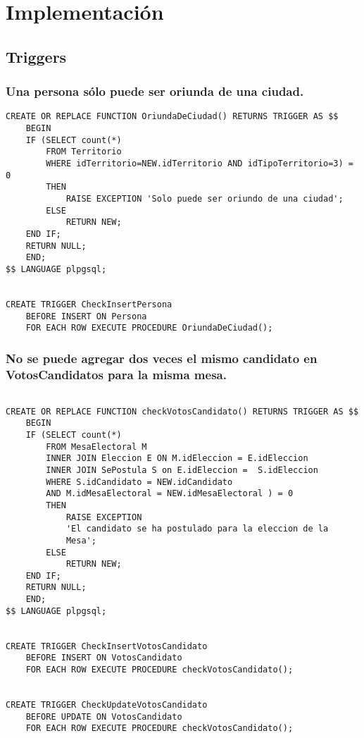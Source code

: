\section{Implementación}


\subsection{Triggers}

\subsubsection{Una persona sólo puede ser oriunda de una ciudad.}

\begin{verbatim}
CREATE OR REPLACE FUNCTION OriundaDeCiudad() RETURNS TRIGGER AS $$
    BEGIN
    IF (SELECT count(*) 
        FROM Territorio 
        WHERE idTerritorio=NEW.idTerritorio AND idTipoTerritorio=3) = 0 
        THEN
            RAISE EXCEPTION 'Solo puede ser oriundo de una ciudad';              
        ELSE
            RETURN NEW;
    END IF;
    RETURN NULL;
    END;
$$ LANGUAGE plpgsql;


CREATE TRIGGER CheckInsertPersona
    BEFORE INSERT ON Persona
    FOR EACH ROW EXECUTE PROCEDURE OriundaDeCiudad();

\end{verbatim}

\subsubsection{No se puede agregar dos veces el mismo candidato en VotosCandidatos para la misma mesa.}
\begin{verbatim}

CREATE OR REPLACE FUNCTION checkVotosCandidato() RETURNS TRIGGER AS $$
    BEGIN
    IF (SELECT count(*) 
        FROM MesaElectoral M 
        INNER JOIN Eleccion E ON M.idEleccion = E.idEleccion
        INNER JOIN SePostula S on E.idEleccion =  S.idEleccion
        WHERE S.idCandidato = NEW.idCandidato 
        AND M.idMesaElectoral = NEW.idMesaElectoral ) = 0
        THEN
            RAISE EXCEPTION 
            'El candidato se ha postulado para la eleccion de la 
            Mesa';              
        ELSE
            RETURN NEW;
    END IF;
    RETURN NULL;
    END;
$$ LANGUAGE plpgsql;


CREATE TRIGGER CheckInsertVotosCandidato
    BEFORE INSERT ON VotosCandidato
    FOR EACH ROW EXECUTE PROCEDURE checkVotosCandidato();


CREATE TRIGGER CheckUpdateVotosCandidato
    BEFORE UPDATE ON VotosCandidato
    FOR EACH ROW EXECUTE PROCEDURE checkVotosCandidato();

\end{verbatim}


